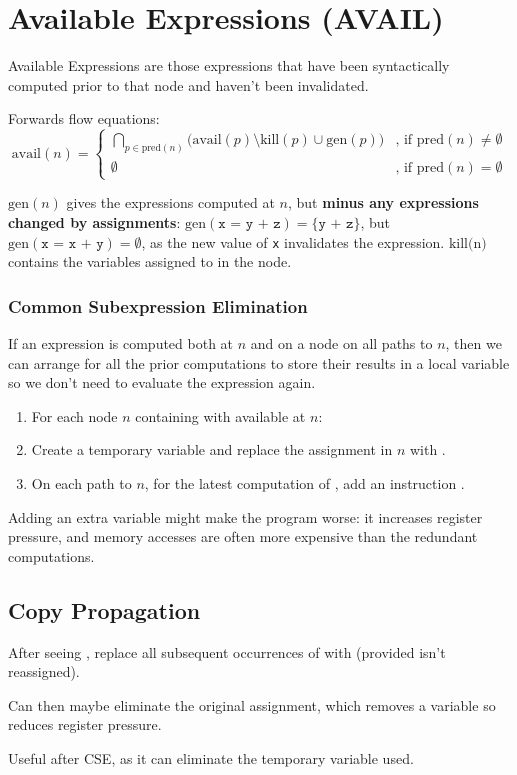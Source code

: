 \documentclass[a4paper, 11pt]{article}
\begin{document}
\section*{Available Expressions (AVAIL)}
{
    Available Expressions are those expressions that have been syntactically computed prior to that node and haven't been invalidated.

    Forwards flow equations:
    \begin{equation*}
    \text{avail}(n) =
    \begin{cases}
    \bigcap_{p \in \text{pred}(n)}{\big(\text{avail}(p) \setminus \text{kill}(p) \cup \text{gen}(p)\big)} &\text{, if pred}(n) \neq \emptyset \\
    \emptyset &\text{, if pred}(n) = \emptyset
    \end{cases}
    \end{equation*}

    \(\text{gen}(n)\) gives the expressions computed at \(n\), but \textbf{minus any expressions changed by assignments}: \(\text{gen}(\texttt{x = y + z}) = \{\texttt{y + z}\}\), but \(\text{gen}(\texttt{x = x + y}) = \emptyset\), as the new value of \texttt{x} invalidates the expression. \(\text{kill(n)}\) contains the variables assigned to in the node.

    \subsubsection*{Common Subexpression Elimination}
    {
        If an expression is computed both at \(n\) and on a node on all paths to \(n\), then we can arrange for all the prior computations to store their results in a local variable so we don't need to evaluate the expression again.

        \begin{enumerate}
        \item For each node \(n\) containing  with  available at \(n\):
        \item Create a temporary variable  and replace the assignment in \(n\) with .
        \item On each path to \(n\), for the latest computation of , add an instruction .
        \end{enumerate}

        Adding an extra variable might make the program worse: it increases register pressure, and memory accesses are often more expensive than the redundant computations.
    }
    \subsection*{Copy Propagation}
    {
        After seeing , replace all subsequent occurrences of  with  (provided  isn't reassigned).

        Can then maybe eliminate the original assignment, which removes a variable so reduces register pressure.

        Useful after CSE, as it can eliminate the temporary variable used.
    }
}
\end{document}
